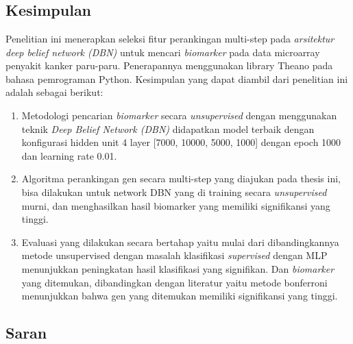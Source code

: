 \chapter{\kesimpulan}
	

\section{Kesimpulan}
Penelitian ini menerapkan seleksi fitur perankingan multi-step pada \textit{arsitektur deep belief network (DBN)} untuk mencari \textit{biomarker} pada data microarray penyakit kanker paru-paru. Penerapannya menggunakan library Theano pada bahasa pemrograman Python. Kesimpulan yang dapat diambil dari penelitian ini adalah sebagai berikut:
\begin{enumerate}
\item Metodologi pencarian \textit{biomarker} secara \textit{unsupervised} dengan menggunakan teknik \textit{Deep Belief Network (DBN)} didapatkan model terbaik  dengan konfigurasi hidden unit 4 layer [7000, 10000, 5000, 1000] dengan epoch 1000 dan learning rate 0.01.
\item Algoritma perankingan gen secara multi-step yang diajukan pada thesis ini, bisa dilakukan untuk network DBN yang di training secara \textit{unsupervised} murni, dan menghasilkan hasil biomarker yang memiliki signifikansi yang tinggi.
\item Evaluasi yang dilakukan secara bertahap yaitu mulai dari dibandingkannya metode unsupervised dengan masalah klasifikasi \textit{supervised} dengan MLP menunjukkan peningkatan hasil klasifikasi yang signifikan. Dan \textit{biomarker} yang ditemukan, dibandingkan dengan literatur yaitu metode bonferroni menunjukkan bahwa gen yang ditemukan memiliki signifikansi yang tinggi.
\end{enumerate}




\section{Saran}

